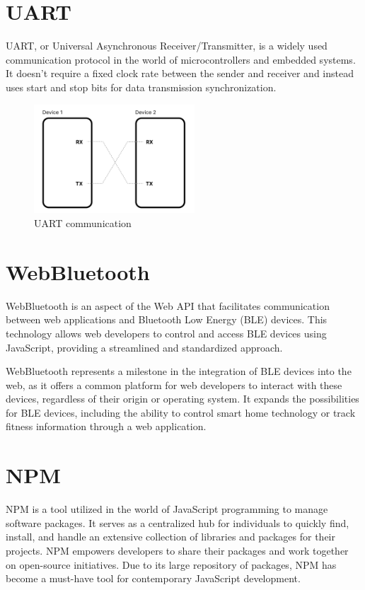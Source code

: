 \documentclass{l4proj}
\begin{document}
\section{UART}
\text UART, or Universal Asynchronous Receiver/Transmitter, is a widely used communication protocol in the world of microcontrollers and embedded systems. It doesn't require a fixed clock rate between the sender and receiver and instead uses start and stop bits for data transmission synchronization.

\begin{figure}
    \centering
    \includegraphics[width=60mm,scale=0.5]{dissertation/images/UART_diagram.png}

    \caption{UART communication}
    \label{fig:my_label}
\end{figure}


\section{WebBluetooth}
\text WebBluetooth is an aspect of the Web API that facilitates communication between web applications and Bluetooth Low Energy (BLE) devices. This technology allows web developers to control and access BLE devices using JavaScript, providing a streamlined and standardized approach.

WebBluetooth represents a milestone in the integration of BLE devices into the web, as it offers a common platform for web developers to interact with these devices, regardless of their origin or operating system. It expands the possibilities for BLE devices, including the ability to control smart home technology or track fitness information through a web application.

\section{NPM}
\text NPM is a tool utilized in the world of JavaScript programming to manage software packages. It serves as a centralized hub for individuals to quickly find, install, and handle an extensive collection of libraries and packages for their projects. NPM empowers developers to share their packages and work together on open-source initiatives. Due to its large repository of packages, NPM has become a must-have tool for contemporary JavaScript development.
\end{document}
